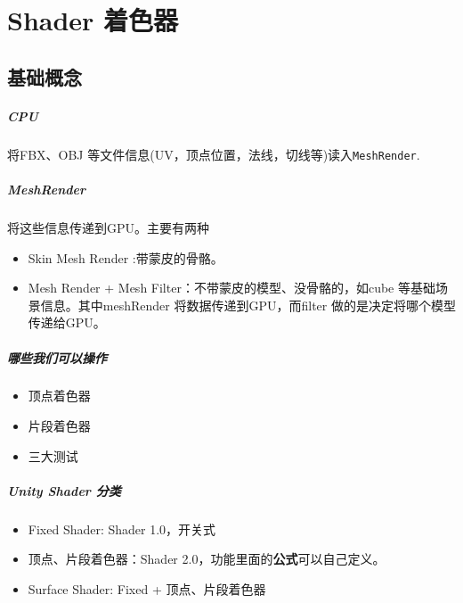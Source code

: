 \documentclass[UTF8,a4paper,12pt]{ctexbook}
\begin{document}
\chapter{Shader 着色器}
	\section{基础概念}
		\paragraph{CPU} 将FBX、OBJ 等文件信息(UV，顶点位置，法线，切线等)读入\verb|MeshRender|.
		
		\paragraph{MeshRender} 将这些信息传递到GPU。主要有两种
			\begin{itemize}
				\item Skin Mesh Render :带蒙皮的骨骼。
				\item Mesh Render + Mesh Filter：不带蒙皮的模型、没骨骼的，如cube 等基础场景信息。其中meshRender 将数据传递到GPU，而filter 做的是决定将哪个模型传递给GPU。
			\end{itemize}
		
		\paragraph{哪些我们可以操作}
			\begin{itemize}
				\item 顶点着色器
				\item 片段着色器
				\item 三大测试
			\end{itemize}
	
		\paragraph{Unity Shader 分类}
			\begin{itemize}
				\item Fixed Shader: Shader 1.0，开关式
				\item 顶点、片段着色器：Shader 2.0，功能里面的\textbf{公式}可以自己定义。
				\item Surface Shader: Fixed + 顶点、片段着色器
			\end{itemize}	
				
\end{document}
